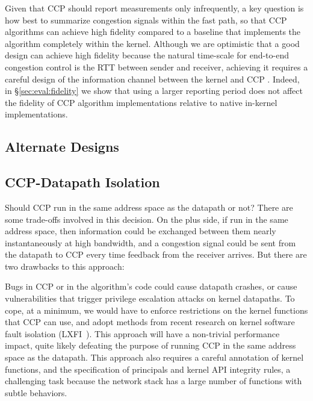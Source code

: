 Given that CCP should report measurements only infrequently, a key question is
how best to summarize congestion signals within the fast path, so that CCP
algorithms can achieve high fidelity compared to a baseline that implements the
algorithm completely within the kernel.
Although we are optimistic that a good design can achieve high fidelity because the natural time-scale for end-to-end
congestion control is the RTT between sender and receiver,
achieving it requires a careful design of the information channel between the kernel and CCP \userspace.
Indeed, in \S\ref{sec:eval:fidelity} we show that using a
larger reporting period does not affect the fidelity of CCP algorithm
implementations relative to native in-kernel implementations.

\subsection{Alternate Designs}
\label{sec:design:alternatives}



\subsection{CCP-Datapath Isolation}

Should CCP run in the same address space as the datapath or not? There are some trade-offs involved in this decision. On the plus side, if run in the same address space, then information could be exchanged between them nearly instantaneously at high bandwidth, and a congestion signal could be sent from the datapath to CCP every time feedback from the receiver arrives. But there are two drawbacks to this approach:

 Bugs in CCP or in the algorithm's code could cause datapath crashes, or cause vulnerabilities that trigger privilege escalation attacks on kernel datapaths. 
To cope, at a minimum, we would have to enforce restrictions on the kernel functions that CCP can use, and adopt methods from recent research on kernel software fault isolation (LXFI~\cite{lxfi}). 
This approach will have a non-trivial performance impact, quite likely defeating the purpose of running CCP in the same address space as the datapath. 
This approach also requires a careful annotation of kernel functions, and the specification of principals and kernel API integrity rules, a challenging task because the network stack has a large number of functions with subtle behaviors.
    
